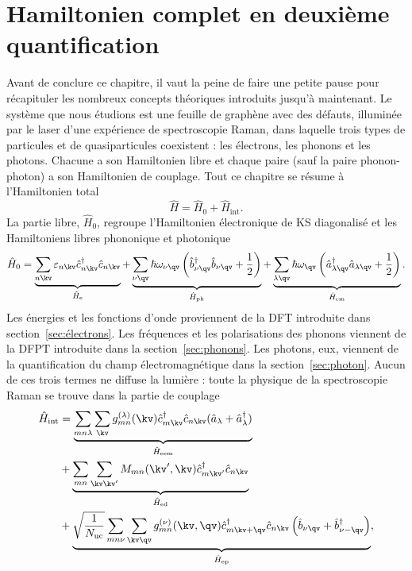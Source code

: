 \section{Hamiltonien complet en deuxième quantification}\label{sec:hamiltonien}
Avant de conclure ce chapitre, il vaut la peine de faire une petite pause pour récapituler les nombreux concepts théoriques introduits jusqu'à maintenant. Le système que nous étudions est une feuille de graphène avec des défauts, illuminée par le laser d'une expérience de spectroscopie Raman, dans laquelle trois types de particules et de quasiparticules coexistent : les électrons, les phonons et les photons. Chacune a son Hamiltonien libre et chaque paire (sauf la paire phonon-photon) a son Hamiltonien de couplage. Tout ce chapitre se résume à l'Hamiltonien total
\begin{equation}
    \hat{H} = \hat{H}_0+\hat{H}_\text{int}.
\end{equation}
La partie libre, $\hat{H}_0$, regroupe l'Hamiltonien électronique de KS diagonalisé et les Hamiltoniens libres phononique et photonique
\begin{equation}
    \hat{H}_0 =\underbrace{\sum_{n\kv}\varepsilon_{n\kv}\hat{c}^\dag_{n\kv}\hat{c}_{n\kv}}_{\hat{H}_\text{e}} + \underbrace{\sum_{\nu\qv}\hbar\omega_{\nu\qv}\left(\hat{b}^\dag_{\nu\qv}\hat{b}_{\nu\qv}+\frac{1}{2}\right)}_{\hat{H}_\text{ph}}+\underbrace{\sum_{\lambda\qv}\hbar\omega_{\qv}\left(\hat{a}_{\lambda\qv}^\dag \hat{a}_{\lambda\qv}+\frac{1}{2}\right)}_{\hat{H}_\text{em}}.
\end{equation}
Les énergies et les fonctions d'onde proviennent de la DFT introduite dans section~\ref{sec:électrons}. Les fréquences et les polarisations des phonons viennent de la DFPT introduite dans la section~\ref{sec:phonons}. Les photons, eux, viennent de la quantification du champ électromagnétique dans la section~\ref{sec:photon}. Aucun de ces trois termes ne diffuse la lumière : toute la physique de la spectroscopie Raman se trouve dans la partie de couplage 
\begin{equation}
    \begin{split}
    \hat{H}_\text{int} &= \underbrace{\sum_{mn\lambda}\sum_\kv g_{mn}^{(\lambda)}(\kv)\hat{c}^\dag_{m\kv}\hat{c}_{n\kv}(\hat{a}_\lambda+\hat{a}_\lambda^\dag)}_{\hat{H}_\text{eem}}\\
    &+ \underbrace{\sum_{mn}\sum_{\kv\kv'}M_{mn}(\kv',\kv)\hat{c}^\dag_{m\kv'}\hat{c}_{n\kv}}_{\hat{H}_\text{ed}}\\
    &+ \underbrace{\sqrt{\frac{1}{N_\text{uc}}}\sum_{mn\nu}\sum_{\kv\qv}g_{mn}^{(\nu)}(\kv,\qv)\hat{c}^\dag_{m\kv+\qv}\hat{c}_{n\kv}\left(\hat{b}_{\nu\qv}+\hat{b}^\dag_{\nu-\qv}\right)}_{\hat{H}_\text{ep}},
    \end{split}
    \label{eqn:H_int}
\end{equation}
